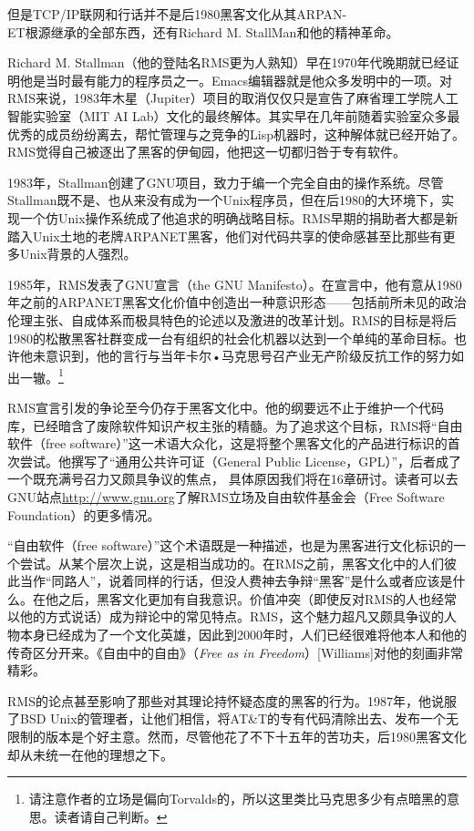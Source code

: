 \documentclass[12pt,oneside]{book}
\begin{document}
\begin{common-format}
但是TCP/IP联网和行话并不是后1980黑客文化从其ARPAN-\\ET根源继承的全部东西，还有Richard M. StallMan和他的精神革命。

Richard M. Stallman（他的登陆名RMS更为人熟知）早在1970年代晚期就已经证明他是当时最有能力的程序员之一。Emacs编辑器就是他众多发明中的一项。对RMS来说，1983年木星（Jupiter）项目的取消仅仅只是宣告了麻省理工学院人工智能实验室（MIT AI Lab）文化的最终解体。其实早在几年前随着实验室众多最优秀的成员纷纷离去，帮忙管理与之竞争的Lisp机器时，这种解体就已经开始了。RMS觉得自己被逐出了黑客的伊甸园，他把这一切都归咎于专有软件。

1983年，Stallman创建了GNU项目，致力于编一个完全自由的操作系统。尽管Stallman既不是、也从来没有成为一个Unix程序员，但在后1980的大环境下，实现一个仿Unix操作系统成了他追求的明确战略目标。RMS早期的捐助者大都是新踏入Unix土地的老牌ARPANET黑客，他们对代码共享的使命感甚至比那些有更多Unix背景的人强烈。

1985年，RMS发表了GNU宣言（the GNU Manifesto）。在宣言中，他有意从1980年之前的ARPANET黑客文化价值中创造出一种意识形态——包括前所未见的政治伦理主张、自成体系而极具特色的论述以及激进的改革计划。RMS的目标是将后1980的松散黑客社群变成一台有组织的社会化机器以达到一个单纯的革命目标。也许他未意识到，他的言行与当年卡尔•马克思号召产业无产阶级反抗工作的努力如出一辙。\footnote{请注意作者的立场是偏向Torvalds的，所以这里类比马克思多少有点暗黑的意思。读者请自己判断。}

RMS宣言引发的争论至今仍存于黑客文化中。他的纲要远不止于维护一个代码库，已经暗含了废除软件知识产权主张的精髓。为了追求这个目标，RMS将“自由软件（free software）”这一术语大众化，这是将整个黑客文化的产品进行标识的首次尝试。他撰写了“通用公共许可证（General Public License，GPL）”，后者成了一个既充满号召力又颇具争议的焦点，  具体原因我们将在16章研讨。读者可以去GNU站点\href{http://www.gnu.org}{http://www.gnu.org}了解RMS立场及自由软件基金会（Free Software Foundation）的更多情况。

“自由软件（free  software）”这个术语既是一种描述，也是为黑客进行文化标识的一个尝试。从某个层次上说，这是相当成功的。在RMS之前，黑客文化中的人们彼此当作“同路人”，说着同样的行话，但没人费神去争辩“黑客”是什么或者应该是什么。在他之后，黑客文化更加有自我意识。价值冲突（即使反对RMS的人也经常以他的方式说话）成为辩论中的常见特点。RMS，这个魅力超凡又颇具争议的人物本身已经成为了一个文化英雄，因此到2000年时，人们已经很难将他本人和他的传奇区分开来。《自由中的自由》（\textit{Free as in Freedom}）[Williams]对他的刻画非常精彩。

RMS的论点甚至影响了那些对其理论持怀疑态度的黑客的行为。1987年，他说服了BSD Unix的管理者，让他们相信，将AT\&{}T的专有代码清除出去、发布一个无限制的版本是个好主意。然而，尽管他花了不下十五年的苦功夫，后1980黑客文化却从未统一在他的理想之下。


\end{common-format}
\end{document}
